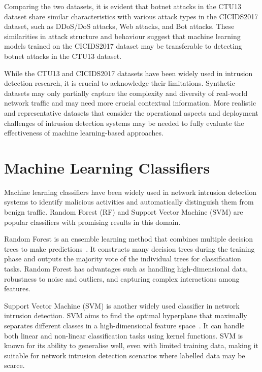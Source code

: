 Comparing the two datasets, it is evident that botnet attacks in the CTU13 dataset share similar characteristics with various attack types in the CICIDS2017 dataset, such as DDoS/DoS attacks, Web attacks, and Bot attacks. These similarities in attack structure and behaviour suggest that machine learning models trained on the CICIDS2017 dataset may be transferable to detecting botnet attacks in the CTU13 dataset.

While the CTU13 and CICIDS2017 datasets have been widely used in intrusion detection research, it is crucial to acknowledge their limitations. Synthetic datasets may only partially capture the complexity and diversity of real-world network traffic and may need more crucial contextual information. More realistic and representative datasets that consider the operational aspects and deployment challenges of intrusion detection systems may be needed to fully evaluate the effectiveness of machine learning-based approaches.

\section{Machine Learning Classifiers}\label{sec:classifiers}

Machine learning classifiers have been widely used in network intrusion detection systems to identify malicious activities and automatically distinguish them from benign traffic. Random Forest (RF) and Support Vector Machine (SVM) are popular classifiers with promising results in this domain.

Random Forest is an ensemble learning method that combines multiple decision trees to make predictions~\cite{hastie2009random}. It constructs many decision trees during the training phase and outputs the majority vote of the individual trees for classification tasks. Random Forest has advantages such as handling high-dimensional data, robustness to noise and outliers, and capturing complex interactions among features.

Support Vector Machine (SVM) is another widely used classifier in network intrusion detection. SVM aims to find the optimal hyperplane that maximally separates different classes in a high-dimensional feature space~\cite{cortes1995support}. It can handle both linear and non-linear classification tasks using kernel functions. SVM is known for its ability to generalise well, even with limited training data, making it suitable for network intrusion detection scenarios where labelled data may be scarce.

